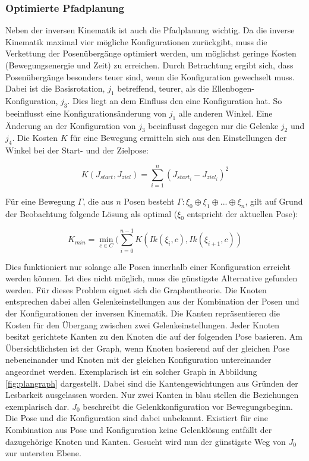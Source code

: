 \subsubsection{Optimierte Pfadplanung}
Neben der inversen Kinematik ist auch die Pfadplanung wichtig. Da die inverse Kinematik maximal vier mögliche Konfigurationen zurückgibt, muss die Verkettung der Posenübergänge optimiert werden, um möglichst geringe Kosten (Bewegungsenergie und Zeit) zu erreichen. Durch Betrachtung ergibt sich, dass Posenübergänge besonders teuer sind, wenn die Konfiguration gewechselt muss. Dabei ist die Basisrotation, $j_1$ betreffend, teurer, als die Ellenbogen-Konfiguration, $j_3$. Dies liegt an dem Einfluss den eine Konfiguration hat. So beeinflusst eine Konfigurationsänderung von $j_1$ alle anderen Winkel. Eine Änderung an der Konfiguration von $j_3$ beeinflusst dagegen nur die Gelenke $j_2$ und $j_4$. Die Kosten $K$ für eine Bewegung ermitteln sich aus den Einstellungen der Winkel bei der Start- und der Zielpose:

\begin{equation}
K(J_{start}, J_{ziel}) = \sum_{i=1}^{n} (J_{start_i} - J_{ziel_i})^2
\label{eq:36}
\end{equation}

Für eine Bewegung $\Gamma$, die aus $n$ Posen besteht $\Gamma: \xi_0 \oplus \xi_1 \oplus ... \oplus \xi_n$, gilt auf Grund der Beobachtung folgende Lösung als optimal ($\xi_0$ entspricht der aktuellen Pose):

\begin{equation}
K_{min} = \min_{c \in C}(\sum_{i=0}^{n-1} K(Ik(\xi_i, c), Ik(\xi_{i+1}, c))
\label{eq:37}
\end{equation}

Dies funktioniert nur solange alle Posen innerhalb einer Konfiguration erreicht werden können. Ist dies nicht möglich, muss die günstigste Alternative gefunden werden. Für dieses Problem eignet sich die Graphentheorie. Die Knoten entsprechen dabei allen Gelenkeinstellungen aus der Kombination der Posen und der Konfigurationen der inversen Kinematik. Die Kanten repräsentieren die Kosten für den Übergang zwischen zwei Gelenkeinstellungen. Jeder Knoten besitzt gerichtete Kanten zu den Knoten die auf der folgenden Pose basieren. Am Übersichtlichsten ist der Graph, wenn Knoten basierend auf der gleichen Pose nebeneinander und Knoten mit der gleichen Konfiguration untereinander angeordnet werden. Exemplarisch ist ein solcher Graph in Abbildung \ref{fig:plangraph} dargestellt. Dabei sind die Kantengewichtungen aus Gründen der Lesbarkeit ausgelassen worden. Nur zwei Kanten in blau stellen die Beziehungen exemplarisch dar. $J_0$ beschreibt die Gelenkkonfiguration vor Bewegungsbeginn. Die Pose und die Konfiguration sind dabei unbekannt. Existiert für eine Kombination aus Pose und Konfiguration keine Gelenklösung entfällt der dazugehörige Knoten und Kanten. Gesucht wird nun der günstigste Weg von $J_0$ zur untersten Ebene.

